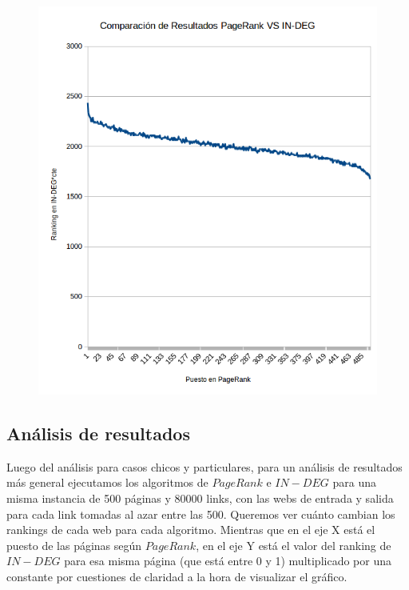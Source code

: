 \newpage



\begin{figure}
  \vspace{-20pt}
  \begin{center}
    \includegraphics[scale= 0.6]{imagenes/pagerankVSindeg.png}
  \end{center}
  \vspace{-10pt}
  \vspace{-10pt}
\end{figure}

\subsection{Análisis de resultados}

Luego del análisis para casos chicos y particulares, para un análisis de resultados más general ejecutamos los algoritmos de $PageRank$ e $IN-DEG$ para una misma instancia de 500 páginas y 80000 links, con las webs de entrada y salida para cada link tomadas al azar entre las 500. Queremos ver cuánto cambian los rankings de cada web para cada algoritmo. Mientras que en el eje X está el puesto de las páginas según $PageRank$, en el eje Y está el valor del ranking de $IN-DEG$ para esa misma página (que está entre 0 y 1) multiplicado por una constante por cuestiones de claridad a la hora de visualizar el gráfico.\\


